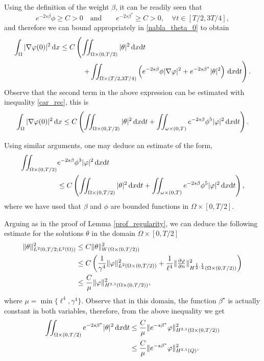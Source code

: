 \documentclass{aims}
\theoremstyle{definition}
\def\dx{\,\textnormal{d}x}
\def\dt{\textnormal{d}t}
\begin{document}
Using the definition of the weight $\beta$, it can be readily seen that
%
\begin{equation*}
e^{-2s\beta}\phi\geq C >0 \quad\text{and}\quad \quad  e^{-2s\beta^*}\geq C>0, \quad \forall t\in[T/2,3T/4],
\end{equation*}
%
and therefore we can bound appropriately in \eqref{nabla_theta_0} to obtain
%
\begin{equation*}
\begin{split}
\int_{\Omega}|\nabla\varphi(0)|^2\dx\leq C&\left(\iint_{\Omega\times(0,T/2)}|\theta|^2\dx\dt\right. \\
&\quad \left. +\iint_{\Omega\times(T/2,3T/4)}\left(e^{-2s\beta}\phi|\nabla\varphi|^2+e^{-2s\beta^\star}|\theta|^2\right)\dx\dt\right).
\end{split}
\end{equation*}
%
Observe that the second term in the above expression can be estimated with inequality \eqref{car_rec}, this is
%
\begin{equation}\label{est_h01_theta}
\int_{\Omega}|\nabla\varphi(0)|^2\dx\leq C\left(\iint_{\Omega\times(0,T/2)}|\theta|^2\dx\dt+\iint_{\omega\times(0,T)}e^{-2s\beta}\phi^5|\varphi|^2\dx\dt\right).
\end{equation}

Using similar arguments, one may deduce an estimate of the form,
%
\begin{equation}\label{est_phi_0}
\begin{split}
\iint_{\Omega\times(0,T/2)}&e^{-2s\beta}\phi^3|\varphi|^2\dx\dt\\
&\leq C\left(\iint_{\Omega\times(0,T/2)}|\theta|^2\dx\dt+\iint_{\omega\times(0,T)}e^{-2s\beta}\phi^5|\varphi|^2\dx\dt\right),
\end{split}
\end{equation}
%
where we have used that $\beta$ and $\phi$ are bounded functions in $\Omega\times[0,T/2]$.

Arguing as in the proof of Lemma \ref{prof_regularity}, we can deduce the following estimate for the solutions $\theta$ in the domain $\Omega\times [0,T/2]$
%
\begin{align}\notag 
\|\theta\|^2_{L^2(0,T/2;L^2(\Omega))}&\leq C\|\theta\|^2_{W(\Omega\times(0,T/2))}\\ \notag
&\leq C\left(\frac{1}{\gamma^4}\|\varphi\|^2_{L^2(\Omega\times(0,T/2))}+\frac{1}{\ell^4}\|\tfrac{\partial \varphi}{\partial n}\|^2_{H^{\frac12,\frac14}(\Omega\times(0,T/2))}\right) \\ \label{est_theta}
&\leq \frac{C}{\mu}\|\varphi\|_{H^{2,1}(\Omega\times(0,T/2))}^2,
\end{align}
%
where $\mu=\min\{\ell^4,\gamma^4\}$. Observe that in this domain, the function $\beta^\star$ is actually constant in both variables, therefore, from the above inequality we get
%
\begin{align}\notag
\iint_{\Omega\times(0,T/2)}e^{-2s\beta^*}|\theta|^2\dx\dt &\leq \frac{C}{\mu}\|e^{-s\beta^*}\varphi\|_{H^{2,1}(\Omega\times(0,T/2))}^2 \\ \label{est_theta_tme}
&\leq \frac{C}{\mu}\|e^{-s\beta^*}\varphi\|_{H^{2,1}(Q)}^2.
\end{align}
%
\end{document}
